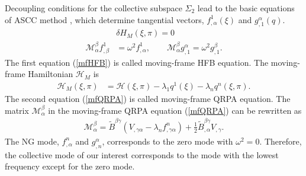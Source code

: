 \documentclass[%
superscriptaddress,
showpacs,
nofootinbib,
amsmath,amssymb,
aps,
prc,
twocolumn,
floatfix ]%
{revtex4-1}
\begin{document}
Decoupling conditions for the collective subspace $\Sigma_2$ lead to
the basic equations of ASCC method \cite{MNM00,N2012},
which determine tangential vectors,
$f^1_{,\alpha}(\xi)$ and $g_{,1}^{\alpha}(q)$.
\begin{align}
  &\delta H_M(\xi,\pi) = 0 \label{mfHFB} \\ 
\mathcal{M}^\beta_\alpha f^1_{,\beta}  &= \omega^2 f^1_{,\alpha},\hspace{2em} 
\mathcal{M}^\beta_\alpha g^{\alpha}_{,1} = \omega^2 g^{\beta}_{,1} .
  \label{mfQRPA}
\end{align}
The first equation (\ref{mfHFB}) is called moving-frame HFB equation.
The moving-frame Hamiltonian $\mathcal{H}_M$
is
\begin{align}
\mathcal{H}_M(\xi,\pi) &= \mathcal{H}(\xi,\pi)
	-\lambda_{1} q^1(\xi) - \lambda_{n} q^n(\xi,\pi) .
\end{align}
The second equation (\ref{mfQRPA}) is called moving-frame QRPA equation.
The matrix $\mathcal{M}^\beta_\alpha$ in the moving-frame QRPA
equation (\ref{mfQRPA}) can be rewritten as 
 \begin{align}
\mathcal{M}^{\beta}_{\alpha} =
	 \tilde{B}^{\beta\gamma}
	 \left(V_{,\gamma\alpha}-\lambda_{n}f^n_{,\gamma\alpha}\right)
	+ \frac{1}{2}\tilde{B}^{\beta\gamma}_{,\alpha}V_{,\gamma} 
\label{M}.
\end{align}
The NG mode, $f^n_{,\alpha}$ and $g^\alpha_{,n}$, corresponds to
the zero mode with $\omega^2=0$.
Therefore, the collective mode of our interest corresponds to
the mode with the lowest frequency except for the zero mode.
\end{document}
